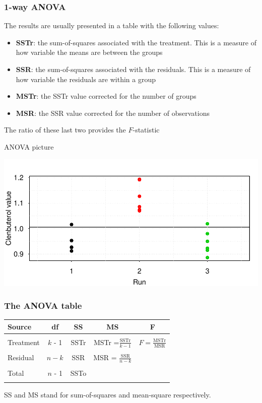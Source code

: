 \documentclass[12pt,xcolor=dvipsnames,handout,mathserif,aspectratio=169]{beamer}
\newcommand{\bbl}[1]{{\color{NavyBlue} \textbf{#1}}}
\begin{document}
\begin{frame}\frametitle{1-way ANOVA}

The results are usually presented in a table with the following values:
\begin{itemize}
\item \bbl{SSTr}: the sum-of-squares associated with the treatment. This is a measure of how variable the means are between the groups
\item \bbl{SSR}: the sum-of-squares associated with the residuals. This is a measure of how variable the residuals are within a group
\item \bbl{MSTr}: the SSTr value corrected for the number of groups
\item \bbl{MSR}: the SSR value corrected for the number of observations
\end{itemize}
The ratio of these last two provides the $F$-statistic
\end{frame}

\begin{frame}{ANOVA picture}

\begin{center}
\includegraphics[width= \textwidth]{anova_plot.pdf}
\end{center}

\end{frame}

\begin{frame}\frametitle{The ANOVA table}

\vspace{0.2cm}
\begin{center}
{\small{
\begin{tabular}{lcccc}\hline
Source& df& SS& MS& F \\ \hline
&&&&\\
Treatment & $k$ - 1& SSTr& MSTr =$\displaystyle\frac{\mbox{SSTr}}{k - 1}$&$F =
 \displaystyle\frac{\mbox{MSTr}}{\mbox{MSR}}$\\
 &&&&\\
Residual &$n - k$& SSR& MSR = $\displaystyle\frac{\mbox{SSR}}{n - k}$& \\
&&&&\\
Total& $n$ - 1& SSTo&&\\
\\ \hline
\end{tabular}}}
\end{center}
SS and MS stand for sum-of-squares and mean-square respectively.
\end{frame}
\end{document}
